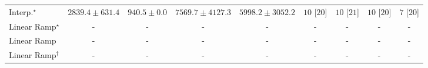 \begin{tabular}{l|cccc|cccc|}
Interp.$^\star$ & {\cellcolor[HTML]{C4CBE3}} \color[HTML]{000000} $2839.4\pm 631.4$ & {\cellcolor[HTML]{FFF7FB}} \color[HTML]{000000} $940.5\pm 0.0$ & {\cellcolor[HTML]{023858}} \color[HTML]{F1F1F1} $7569.7\pm 4127.3$ & {\cellcolor[HTML]{056DAC}} \color[HTML]{F1F1F1} $5998.2\pm 3052.2$ & {\cellcolor[HTML]{49006A}} \color[HTML]{F1F1F1} $10$ [$20$] & {\cellcolor[HTML]{49006A}} \color[HTML]{F1F1F1} $10$ [$21$] & {\cellcolor[HTML]{49006A}} \color[HTML]{F1F1F1} $10$ [$20$] & {\cellcolor[HTML]{CD238F}} \color[HTML]{F1F1F1} $7$ [$20$] \\
Linear Ramp$^\star$ & {\cellcolor[HTML]{000000}} \color[HTML]{F1F1F1} {\cellcolor{white}} \color{black} - & {\cellcolor[HTML]{000000}} \color[HTML]{F1F1F1} {\cellcolor{white}} \color{black} - & {\cellcolor[HTML]{000000}} \color[HTML]{F1F1F1} {\cellcolor{white}} \color{black} - & {\cellcolor[HTML]{000000}} \color[HTML]{F1F1F1} {\cellcolor{white}} \color{black} - & {\cellcolor[HTML]{000000}} \color[HTML]{F1F1F1} {\cellcolor{white}} \color{black} - & {\cellcolor[HTML]{000000}} \color[HTML]{F1F1F1} {\cellcolor{white}} \color{black} - & {\cellcolor[HTML]{000000}} \color[HTML]{F1F1F1} {\cellcolor{white}} \color{black} - & {\cellcolor[HTML]{000000}} \color[HTML]{F1F1F1} {\cellcolor{white}} \color{black} - \\
Linear Ramp & {\cellcolor[HTML]{000000}} \color[HTML]{F1F1F1} {\cellcolor{white}} \color{black} - & {\cellcolor[HTML]{000000}} \color[HTML]{F1F1F1} {\cellcolor{white}} \color{black} - & {\cellcolor[HTML]{000000}} \color[HTML]{F1F1F1} {\cellcolor{white}} \color{black} - & {\cellcolor[HTML]{000000}} \color[HTML]{F1F1F1} {\cellcolor{white}} \color{black} - & {\cellcolor[HTML]{000000}} \color[HTML]{F1F1F1} {\cellcolor{white}} \color{black} - & {\cellcolor[HTML]{000000}} \color[HTML]{F1F1F1} {\cellcolor{white}} \color{black} - & {\cellcolor[HTML]{000000}} \color[HTML]{F1F1F1} {\cellcolor{white}} \color{black} - & {\cellcolor[HTML]{000000}} \color[HTML]{F1F1F1} {\cellcolor{white}} \color{black} - \\
Linear Ramp$^\dagger$ & {\cellcolor[HTML]{000000}} \color[HTML]{F1F1F1} {\cellcolor{white}} \color{black} - & {\cellcolor[HTML]{000000}} \color[HTML]{F1F1F1} {\cellcolor{white}} \color{black} - & {\cellcolor[HTML]{000000}} \color[HTML]{F1F1F1} {\cellcolor{white}} \color{black} - & {\cellcolor[HTML]{000000}} \color[HTML]{F1F1F1} {\cellcolor{white}} \color{black} - & {\cellcolor[HTML]{000000}} \color[HTML]{F1F1F1} {\cellcolor{white}} \color{black} - & {\cellcolor[HTML]{000000}} \color[HTML]{F1F1F1} {\cellcolor{white}} \color{black} - & {\cellcolor[HTML]{000000}} \color[HTML]{F1F1F1} {\cellcolor{white}} \color{black} - & {\cellcolor[HTML]{000000}} \color[HTML]{F1F1F1} {\cellcolor{white}} \color{black} - \\

\end{tabular}
